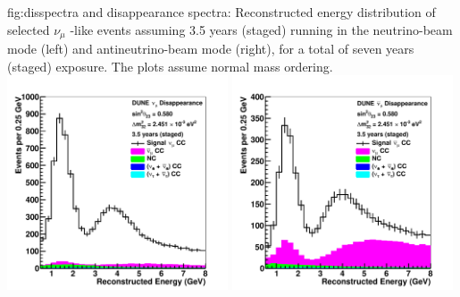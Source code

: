 \begin{dunefigure}{fig:disspectra}
{\numu and \anumu disappearance spectra: Reconstructed energy distribution of selected $\nu_{\mu}$ -like events assuming 3.5 years (staged) running in the neutrino-beam mode (left) and antineutrino-beam mode (right), for a total of seven years (staged) exposure. The plots assume normal mass ordering.}
\includegraphics[width=0.49\textwidth]{graphics/spec_dis_nu.pdf}
\includegraphics[width=0.49\textwidth]{graphics/spec_dis_anu.pdf}
\end{dunefigure}



